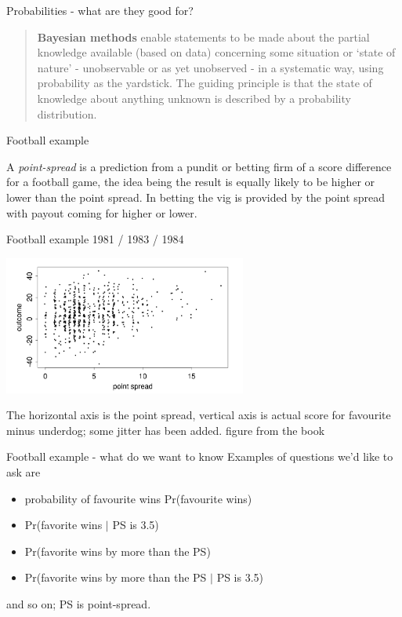 \documentclass{beamer}
\newcommand{\coblu}{\color{blue}{}}
\newcommand{\cor}{\color{reddish}{}}
\newcommand{\cob}{\color{black}{}}
\begin{document}
\begin{frame}{Probabilities - what are they good for?}
\begin{quote}
\textbf{Bayesian methods} enable statements to be made about the
partial knowledge available (based on data) concerning some situation
or `state of nature' - unobservable or as yet unobserved - in a
systematic way, using probability as the yardstick. The guiding
principle is that the state of knowledge about anything unknown is
described by a probability distribution.
\end{quote}
\end{frame}

\begin{frame}{Football example}

  A \textsl{point-spread} is a prediction from a pundit or betting
  firm of a score difference for a football game, the idea being the
  result is equally likely to be higher or lower than the point
  spread. In betting the vig is provided by the point spread with
  payout coming for higher or lower.

\end{frame}


\begin{frame}{Football example 1981 / 1983 / 1984}

\begin{center}
    \includegraphics[width=8cm]{football_results.png}
\end{center}

The \coblu{}horizontal axis\cob{} is the point spread, \coblu{}vertical axis\cob{} is actual score for favourite minus underdog; some jitter has been added.
\vfill
\color{gray}figure from the book\cob

\end{frame}

\begin{frame}{Football example - what do we want to know}
  Examples of questions we'd like to ask are
\vskip 0.75cm
  \begin{itemize}
  \item probability of favourite wins \cor{}Pr(favourite wins)\cob
  \item \cor{}Pr(favorite wins $|$ PS is 3.5)\cob
  \item \cor{}Pr(favorite wins by more than the PS)\cob
  \item \cor{}Pr(favorite wins by more than the PS $|$ PS is 3.5)\cob
  \end{itemize}
  \vskip 0.75cm
  and so on; PS is point-spread.
\end{frame}
\end{document}
